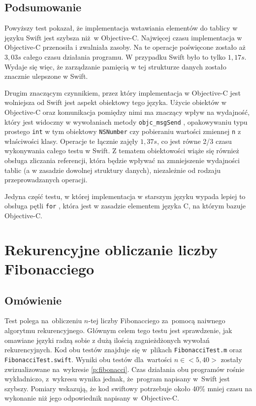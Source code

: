 \documentclass[mgr, shortabstract]{iithesis}
\newcommand{\objcinline}[1]{
    \texttt{#1}
}
\begin{document}
\subsection{Podsumowanie}

Powyższy test pokazał, że implementacja wstawiania elementów do tablicy w języku Swift jest szybsza niż w Objective-C. Najwięcej czasu implementacja w Objective-C przenosiła i zwalniała zasoby. Na te operacje poświęcone zostało aż $3,03s$ całego czasu działania programu. W przypadku Swift było to tylko $1,17s$. Wydaje się więc, że zarządzanie pamięcią w tej strukturze danych zostało znacznie ulepszone w Swift.

Drugim znaczącym czynnikiem, przez który implementacja w Objective-C jest wolniejsza od Swift jest aspekt obiektowy tego języka. Użycie obiektów w Objective-C oraz komunikacja pomiędzy nimi ma znaczący wpływ na wydajność, który jest widoczny w wywołaniach metody \objcinline{objc_msgSend}, opakowywaniu typu prostego \objcinline{int} w tym obiektowy \objcinline{NSNumber} czy pobieraniu wartości zmiennej \objcinline{n} z właściwości klasy. Operacje te łącznie zajęły $1,37s$, co jest równe 2/3 czasu wykonywania całego testu w Swift. Z tematem obiektowości wiąże się również obsługa zliczania referencji, która będzie wpływać na zmniejszenie wydajności tablic (a w zasadzie dowolnej struktury danych), niezależnie od rodzaju przeprowadzanych operacji.

Jedyna część testu, w której implementacja w starszym języku wypada lepiej to obsługa pętli \objcinline{for}, która jest w zasadzie elementem języka C, na którym bazuje Objective-C.

\section{Rekurencyjne obliczanie liczby Fibonacciego}
\label{s:fibonacci}

\subsection{Omówienie}

Test polega na~obliczeniu $n$-tej liczby Fibonacciego za~pomocą naiwnego algorytmu rekurencyjnego. Głównym celem tego testu jest sprawdzenie, jak omawiane języki radzą sobie z dużą ilością zagnieżdżonych wywołań rekurencyjnych. Kod obu testów znajduje się w~plikach \texttt{FibonacciTest.m} oraz \texttt{FibonacciTest.swift}. Wyniki obu testów dla~wartości $n \in <5, 40>$ zostały zwizualizowane na~wykresie \ref{p:fibonacci}. Czas działania obu programów rośnie wykładniczo, z~wykresu wynika jednak, że~program napisany w~Swift jest szybszy. Pomiary wskazują, że kod swiftowy potrzebuje około 40\% mniej czasu na wykonanie niż jego odpowiednik napisany w~Objective-C.
\end{document}
